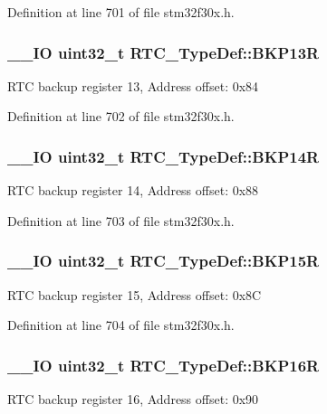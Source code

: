 Definition at line 701 of file stm32f30x.\-h.

\hypertarget{struct_r_t_c___type_def_a138903d4681455a660dccbaf3409263d}{
\subsubsection[{B\-K\-P13\-R}]{\setlength{\rightskip}{0pt plus 5cm}\-\_\-\-\_\-\-I\-O {\bf uint32\-\_\-t} R\-T\-C\-\_\-\-Type\-Def\-::\-B\-K\-P13\-R}}\label{struct_r_t_c___type_def_a138903d4681455a660dccbaf3409263d}
R\-T\-C backup register 13, Address offset\-: 0x84 

Definition at line 702 of file stm32f30x.\-h.

\hypertarget{struct_r_t_c___type_def_adaae50f5c3213014fb9818eaee389676}{
\subsubsection[{B\-K\-P14\-R}]{\setlength{\rightskip}{0pt plus 5cm}\-\_\-\-\_\-\-I\-O {\bf uint32\-\_\-t} R\-T\-C\-\_\-\-Type\-Def\-::\-B\-K\-P14\-R}}\label{struct_r_t_c___type_def_adaae50f5c3213014fb9818eaee389676}
R\-T\-C backup register 14, Address offset\-: 0x88 

Definition at line 703 of file stm32f30x.\-h.

\hypertarget{struct_r_t_c___type_def_a797f43f9cc1858baebd1799be288dff6}{
\subsubsection[{B\-K\-P15\-R}]{\setlength{\rightskip}{0pt plus 5cm}\-\_\-\-\_\-\-I\-O {\bf uint32\-\_\-t} R\-T\-C\-\_\-\-Type\-Def\-::\-B\-K\-P15\-R}}\label{struct_r_t_c___type_def_a797f43f9cc1858baebd1799be288dff6}
R\-T\-C backup register 15, Address offset\-: 0x8\-C 

Definition at line 704 of file stm32f30x.\-h.

\hypertarget{struct_r_t_c___type_def_a181ad73082bde7d74010aac16bd373fc}{
\subsubsection[{B\-K\-P16\-R}]{\setlength{\rightskip}{0pt plus 5cm}\-\_\-\-\_\-\-I\-O {\bf uint32\-\_\-t} R\-T\-C\-\_\-\-Type\-Def\-::\-B\-K\-P16\-R}}\label{struct_r_t_c___type_def_a181ad73082bde7d74010aac16bd373fc}
R\-T\-C backup register 16, Address offset\-: 0x90 

